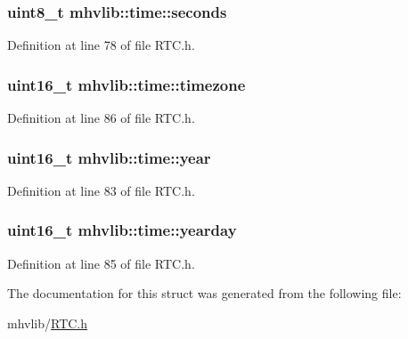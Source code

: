 \hypertarget{structmhvlib_1_1time_ad1bc14b0ac5176d5dc09295e97635530}{
\subsubsection[{seconds}]{\setlength{\rightskip}{0pt plus 5cm}uint8\-\_\-t mhvlib\-::time\-::seconds}}\label{structmhvlib_1_1time_ad1bc14b0ac5176d5dc09295e97635530}


Definition at line 78 of file R\-T\-C.\-h.

\hypertarget{structmhvlib_1_1time_a23553b1b821151cf502d83aad78c2584}{
\subsubsection[{timezone}]{\setlength{\rightskip}{0pt plus 5cm}uint16\-\_\-t mhvlib\-::time\-::timezone}}\label{structmhvlib_1_1time_a23553b1b821151cf502d83aad78c2584}


Definition at line 86 of file R\-T\-C.\-h.

\hypertarget{structmhvlib_1_1time_a1b56819ba3570d83f26f858229a7b8f1}{
\subsubsection[{year}]{\setlength{\rightskip}{0pt plus 5cm}uint16\-\_\-t mhvlib\-::time\-::year}}\label{structmhvlib_1_1time_a1b56819ba3570d83f26f858229a7b8f1}


Definition at line 83 of file R\-T\-C.\-h.

\hypertarget{structmhvlib_1_1time_a640b9d59757af0bdb141d98d6ccfc0d4}{
\subsubsection[{yearday}]{\setlength{\rightskip}{0pt plus 5cm}uint16\-\_\-t mhvlib\-::time\-::yearday}}\label{structmhvlib_1_1time_a640b9d59757af0bdb141d98d6ccfc0d4}


Definition at line 85 of file R\-T\-C.\-h.



The documentation for this struct was generated from the following file\-:\begin{DoxyCompactItemize}
\item 
mhvlib/\hyperlink{_r_t_c_8h}{R\-T\-C.\-h}\end{DoxyCompactItemize}
